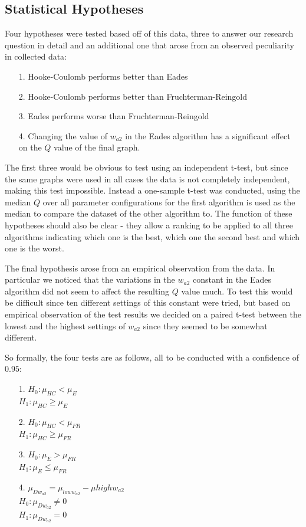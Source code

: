 \documentclass[a4paper,12pt]{article}
\begin{document}
  \subsection{Statistical Hypotheses}
  Four hypotheses were tested based off of this data, three to answer our research question in detail and an additional one that arose from an observed peculiarity in collected data:
  \begin{itemize}
  	\item[1.] Hooke-Coulomb performs better than Eades
  	\item[2.] Hooke-Coulomb performs better than Fruchterman-Reingold
  	\item[3.] Eades performs worse than Fruchterman-Reingold
  	\item[4.] Changing the value of $w_{a2}$ in the Eades algorithm has a significant effect on the $Q$ value of the final graph.
  \end{itemize}
  
  The first three would be obvious to test using an independent t-test, but since the same graphs were used in all cases the data is not completely independent, making this test impossible. Instead a one-sample t-test was conducted, using the median $Q$ over all parameter configurations for the first algorithm is used as the median to compare the dataset of the other algorithm to. The function of these hypotheses should also be clear - they allow a ranking to be applied to all three algorithms indicating which one is the best, which one the second best and which one is the worst.
  
  The final hypothesis arose from an empirical observation from the data. In particular we noticed that the variations in the $w_{a2}$ constant in the Eades algorithm did not seem to affect the resulting $Q$ value much. To test this would be difficult since ten different settings of this constant were tried, but based on empirical observation of the test results we decided on a paired t-test between the lowest and the highest settings of $w_{a2}$ since they seemed to be somewhat different.
  
  So formally, the four tests are as follows, all to be conducted with a confidence of $0.95$:
  \begin{itemize}
  	\item[1.] $H_{0}: \mu_{HC} < \mu_{E}$ \\
			  $H_{1}: \mu_{HC} \geq \mu_{E}$
	\item[2.] $H_{0}: \mu_{HC} < \mu_{FR}$ \\
			  $H_{1}: \mu_{HC} \geq \mu_{FR}$
	\item[3.] $H_{0}: \mu_{E} > \mu_{FR}$ \\
		      $H_{1}: \mu_{E} \leq \mu_{FR}$
	\item[4.] $\mu_{Dw_{a2}} = \mu_{loww_{a2}} - \mu{highw_{a2}}$ \\
			  $H_{0}: \mu_{Dw_{a2}} \neq 0$ \\
			  $H_{1}: \mu_{Dw_{a2}} = 0$
  \end{itemize}
  
\end{document}

